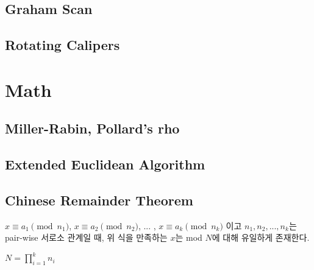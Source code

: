 \documentclass[10pt,landscape,a4paper,twocolumn]{article}
\begin{document}
\subsection{Graham Scan}


\subsection{Rotating Calipers}


\iffalse
\subsection{Plane Sweeping with Segment Tree}
시간복잡도 : $O(N\log{N})$

\fi



\section{Math}
\subsection{Miller-Rabin, Pollard's rho}


\subsection{Extended Euclidean Algorithm}


\subsection{Chinese Remainder Theorem}
$x \equiv a_1 \pmod{n_1}$, $x \equiv a_2 \pmod{n_2}$, ... , $x \equiv a_k \pmod{n_k}$ 이고 $n_1, n_2, ... , n_k$는 pair-wise 서로소 관계일 때, 위 식을 만족하는 $x$는 mod $N$에 대해 유일하게 존재한다.\\
\begin{large}
$N = \prod_{i=1}^k {n_i}$
\end{large}

\end{document}
